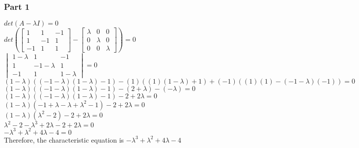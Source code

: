 \documentclass{report}
\begin{document}
\subsubsection*{Part 1}
\begin{center}
    $det(A-\lambda I)=0$\\\vspace{3mm}
    $det(
        \begin{bmatrix}
            1 & 1 & -1 \\ 
            1 & -1 & 1 \\ 
            -1 & 1 & 1 
        \end{bmatrix}
        -
        \begin{bmatrix}
            \lambda & 0 & 0 \\
            0 & \lambda & 0 \\
            0 & 0 & \lambda
        \end{bmatrix}
    )=0
    $\\\vspace{3mm}
    $\begin{vmatrix}
            1-\lambda & 1 & -1 \\ 
            1 & -1-\lambda & 1 \\ 
            -1 & 1 & 1-\lambda
        \end{vmatrix}
        =0
    $\\\vspace{3mm}
    $(1-\lambda)((-1-\lambda)(1-\lambda)-1)-
    (1)((1)(1-\lambda)+1)+
    (-1)((1)(1)-(-1-\lambda)(-1))
    =0
    $\\\vspace{3mm}
    $(1-\lambda)((-1-\lambda)(1-\lambda)-1)-
    (2+\lambda)-
    (-\lambda)
    =0
    $\\\vspace{3mm}
    $(1-\lambda)((-1-\lambda)(1-\lambda)-1)-2+2\lambda
    =0
    $\\\vspace{3mm}
    $(1-\lambda)(-1+\lambda-\lambda+\lambda^2-1)-2+2\lambda
    =0
    $\\\vspace{3mm}
    $(1-\lambda)(\lambda^2-2)-2+2\lambda
    =0
    $\\\vspace{3mm}
    $\lambda^2-2-\lambda^3+2\lambda-2+2\lambda
    =0
    $\\\vspace{3mm}
    $-\lambda^3+\lambda^2+4\lambda-4
    =0
    $\\\vspace{3mm}
    Therefore, the characteristic equation is $-\lambda^3+\lambda^2+4\lambda-4$
\end{center}
\end{document}
